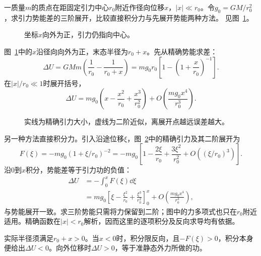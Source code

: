 \begin{exercise}[非匀强引力中的小位移]\label{ex:c1-h15}
一质量$m$的质点在距固定引力中心$r_0$附近作径向位移$x$，$|x|\ll r_0$。令$g_0=GM/r_0^2$，求引力势能差的三阶展开，比较直接积分力与先展开势能两种方法。 见图~\ref{fig:c1-h15-q}。
\end{exercise}

\begin{figure}[H]\centering
{}
\caption{坐标$x$向外为正，引力仍指向中心。}\label{fig:c1-h15-q}
\end{figure}
\begin{solution}
图~\ref{fig:c1-h15-q}中的$x$沿径向向外为正，末态半径为$r_0+x$。先从精确势能求差：
\[
 \Delta U=GMm\left(\frac1{r_0}-\frac1{r_0+x}\right)
 =mg_0r_0\left[1-\left(1+\frac{x}{r_0}\right)^{-1}\right].
\]
在$|x|/r_0\ll1$时展开括号，
\[
 \boxed{\Delta U=mg_0\left(x-\frac{x^2}{r_0}
 +\frac{x^3}{r_0^2}\right)+O\left(\frac{mg_0x^4}{r_0^3}\right)}.
\]
\begin{figure}[H]\centering
{}
\caption{实线为精确引力大小，虚线为二阶近似，离展开点越远误差越大。}\label{fig:c1-h15-s}
\end{figure}
另一种方法直接积分力。引入沿途位移$\xi$，图~\ref{fig:c1-h15-s}中的精确引力及其二阶展开为
\[
 F(\xi)=-mg_0(1+\xi/r_0)^{-2}
 =-mg_0\left[1-\frac{2\xi}{r_0}
 +\frac{3\xi^2}{r_0^2}+O((\xi/r_0)^3)\right].
\]
沿$0$到$x$积分，势能差等于引力功的负值：
\[
 \begin{aligned}
 \Delta U&=-\int_0^x F(\xi)\dd\xi\\
 &=mg_0\left[\xi-\frac{\xi^2}{r_0}
 +\frac{\xi^3}{r_0^2}\right]_0^x
 +O\left(\frac{mg_0x^4}{r_0^3}\right),
 \end{aligned}
\]
与势能展开一致。求三阶势能只需将力保留到二阶；图中的力多项式也只在$r_0$附近适用。精确函数在$|x|<r_0$解析，因而这里的逐项积分及反向求导均有依据。

实际半径须满足$r_0+x>0$。当$x<0$时，积分限反向，且$-F(\xi)>0$，积分本身便给出$\Delta U<0$。向外位移时$\Delta U>0$，等于准静态外力所做的功。
\end{solution}

